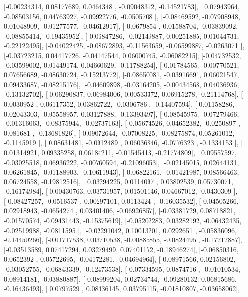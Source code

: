 \documentclass{article}
\begin{document}
       [-0.00234314,  0.08177689,  0.0464348 , -0.09048312, -0.14521783],
       [ 0.07943964, -0.08503156,  0.04763927, -0.09922776, -0.0505708 ],
       [-0.08469592, -0.07908948,  0.01048909, -0.01277577, -0.04612917],
       [-0.0679854 ,  0.01588704, -0.03839092, -0.08855414, -0.19435952],
       [-0.06847286, -0.02149887,  0.00251885,  0.01044731, -0.22122495],
       [-0.04022425, -0.08672893, -0.11563659, -0.06599887, -0.0263071 ],
       [-0.03723215,  0.04417726, -0.04147544,  0.06000745, -0.06082215],
       [-0.04732532, -0.03599002,  0.01449174,  0.04660629, -0.11788254],
       [ 0.01784565, -0.00770521,  0.07656689, -0.08630724, -0.15213772],
       [-0.08650081, -0.03916691,  0.06021547,  0.09433687, -0.08215176],
       [-0.04609898, -0.03164205, -0.00434568,  0.04036936, -0.13132702],
       [ 0.06290837,  0.06984006,  0.00533372,  0.06915278, -0.21114768],
       [ 0.0030952 ,  0.06117352,  0.03862722, -0.0306786 , -0.14407594],
       [ 0.01158286,  0.02043303, -0.05558957,  0.03127888, -0.13393497],
       [ 0.08545975, -0.07279466, -0.01316063, -0.08375944, -0.02737163],
       [-0.05674526,  0.04652382, -0.0250897 ,  0.081681  , -0.18681826],
       [ 0.09072644, -0.07008225, -0.08275874,  0.05261012, -0.1145919 ],
       [ 0.08631481, -0.0912489 ,  0.06036846, -0.0776323 , -0.1334153 ],
       [ 0.01314921,  0.09335258,  0.06184211, -0.01545413, -0.21774809],
       [ 0.09557597, -0.03025518,  0.06936222, -0.00760594, -0.21096053],
       [-0.02145015,  0.02644131,  0.06261845, -0.01188903, -0.10611943],
       [ 0.06822161, -0.01421987,  0.08566463,  0.06724558, -0.19812516],
       [ 0.03294225,  0.0114097 ,  0.03802539,  0.05730071, -0.16174984],
       [-0.00430763,  0.03731957,  0.01501146,  0.04667012, -0.0430309 ],
       [-0.08427257, -0.0516537 ,  0.00297101,  0.0113424 , -0.16035532],
       [-0.04505266,  0.02918943, -0.0654274 ,  0.03401406, -0.06926857],
       [-0.03381729,  0.08718821, -0.01570574, -0.09431443, -0.15375619],
       [-0.05202283,  0.03282192, -0.06432435, -0.02519988, -0.0811595 ],
       [-0.02291042,  0.10013201,  0.0292651 , -0.05836096, -0.14450266],
       [-0.01717538,  0.03710538, -0.00885855, -0.0824495 , -0.17212887],
       [-0.03513589,  0.07417294,  0.03279499,  0.07401172, -0.18946274],
       [-0.06850316,  0.0652392 ,  0.05722695, -0.04172281, -0.04694964],
       [-0.08971566,  0.02156802, -0.03052755, -0.06843339, -0.12473538],
       [ 0.07334595,  0.0874716 , -0.01010534,  0.08914181, -0.03880887],
       [ 0.08999204,  0.02734744, -0.09280132,  0.06815686, -0.16436493],
       [ 0.0797529 ,  0.08436145,  0.03795115, -0.01810807, -0.03658062],
\end{document}

